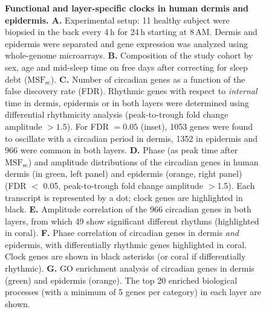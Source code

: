 \begin{figure}
\begin{center}
		\caption{\textbf{Functional and layer-specific clocks in human dermis and epidermis. A.} Experimental setup: 11 healthy subject were biopsied in the back every 4\,h for 24\,h starting at 8\,AM. Dermis and epidermis were separated and gene expression was analyzed using whole-genome microarrays.\textbf{ B. }Composition of the study cohort by sex, age and mid-sleep time on free days after correcting for sleep debt ($\textrm{MSF}_\textrm{sc}$). \textbf{C.} Number of circadian genes as a function of the false discovery rate (FDR). Rhythmic genes with respect to \textit{internal} time in dermis, epidermis or in both layers were determined using differential rhythmicity analysis (peak-to-trough fold change amplitude $>1.5$). For FDR $=0.05$ (inset), 1053 genes were found to oscillate with a circadian period in dermis, 1352 in epidermis and 966 were common in both layers. \textbf{D. }Phase (as peak time after $\textrm{MSF}_\textrm{sc}$) and amplitude distributions of the circadian genes in human dermis (in green, left panel) and epidermis (orange, right panel) (FDR $<$ 0.05, peak-to-trough fold change amplitude $>$1.5). Each transcript is represented by a dot; clock genes are highlighted in black. \textbf{E. }Amplitude correlation of the 966 circadian genes in both layers, from which 49 show significant different rhythms (highlighted in coral). \textbf{F. }Phase correlation of circadian genes in dermis \textit{and} epidermis, with differentially rhythmic genes highlighted in coral. Clock genes are shown in black asterisks (or coral if differentially rhythmic). \textbf{G.} GO enrichment analysis of circadian genes in dermis (green) and epidermis (orange). The top 20 enriched biological processes (with a minimum of 5 genes per category) in each layer are shown. } %
		\label{fig:fig1}
	\end{center}
\end{figure}


